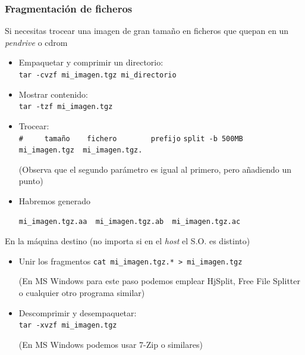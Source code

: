 \documentclass[ucs]{beamer}
\begin{document}
\begin{frame}[fragile]

\frametitle{Fragmentación de ficheros }
Si necesitas trocear una imagen de gran tamaño en ficheros que quepan en un 
\emph{pendrive} o cdrom

\begin{itemize}
\item
Empaquetar y comprimir un directorio:\\ \verb|tar -cvzf mi_imagen.tgz mi_directorio|
\item
Mostrar contenido:\\ \verb|tar -tzf mi_imagen.tgz|

\item
Trocear:\\
\verb|#     tamaño    fichero        prefijo|
\verb|split -b 500MB  mi_imagen.tgz  mi_imagen.tgz.|
\begin{footnotesize}
(Observa que el segundo parámetro es igual al primero, pero
añadiendo un punto)
\end{footnotesize}


\item
Habremos generado
  \begin{footnotesize}
  \begin{verbatim}
mi_imagen.tgz.aa  mi_imagen.tgz.ab  mi_imagen.tgz.ac
  \end{verbatim}
  \end{footnotesize}
\end{itemize}
\end{frame}

\begin{frame}[fragile]
En la máquina destino (no importa si en el \emph{host} el S.O. es distinto)
\begin{itemize}
\item
Unir los fragmentos
\verb|cat mi_imagen.tgz.* > mi_imagen.tgz|

(En MS Windows para este paso podemos emplear HjSplit, Free File Splitter o cualquier otro programa similar)
\item
Descomprimir y desempaquetar:\\ \verb|tar -xvzf mi_imagen.tgz |

(En MS Windows podemos usar 7-Zip  o similares)
\end{itemize}

\end{frame}
\end{document}
